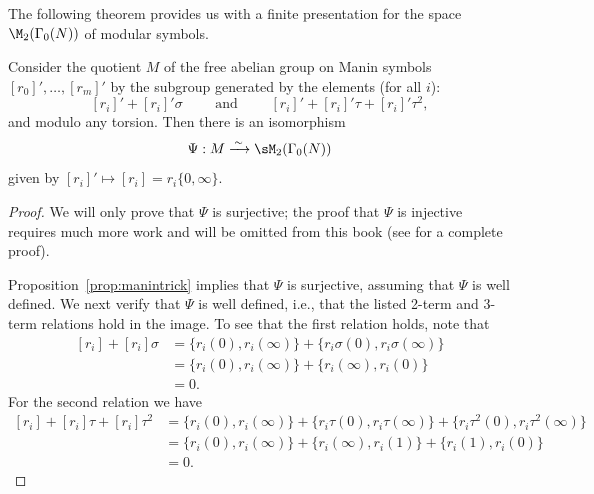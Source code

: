 The following theorem provides us with a finite presentation for the
space $\M_2(\Gamma_0(N))$ of modular symbols.
\begin{theorem}[Manin]\label{thm:manin_present}
Consider the quotient $M$ of the free abelian group
on Manin symbols $[r_0]',\ldots,[r_m]'$ by the subgroup
generated by the elements (for all $i$):
$$
{[r_i]'} + [r_i]'\sigma \qquad\text{ and }\qquad
{[r_i]'} + [r_i]'\tau + [r_i]'\tau^2 ,
$$
and modulo any torsion.
Then there is an isomorphism 
$$\Psi: M \xrightarrow{\,\sim\,} \sM_2(\Gamma_0(N))$$
given by $[r_i]' \mapsto [r_i] = r_i \{0,\infty\}$.
\end{theorem}
\begin{proof}
We will only prove that $\Psi$ is surjective;
the proof that $\Psi$ is injective requires much more work and
will be omitted from this book (see \cite[\S1.7]{manin:parabolic}
for a complete proof). 

Proposition~\ref{prop:manintrick} implies that 
$\Psi$ is surjective, assuming that $\Psi$ is
well defined. 
We next verify that $\Psi$ is well defined, i.e.,
that the listed 2-term and 3-term relations hold in
the image. 
To see that the first relation holds, note that
\begin{align*}
  {[r_i]} + [r_i]\sigma 
  &= \{r_i(0),r_i(\infty)\} +  \{r_i\sigma(0), r_i\sigma(\infty)\}\\
&= \{r_i(0),r_i(\infty)\} +  \{r_i(\infty), r_i(0)\} \\
 & = 0.
\end{align*}
For the second relation we have
\begin{align*}
{[r_i]} + [r_i]\tau + [r_i]\tau^2 &= 
    \{r_i(0),r_i(\infty)\} +  \{r_i\tau(0), r_i\tau(\infty)\}
                  + \{r_i\tau^2(0), r_i\tau^2(\infty)\} \\
  &= \{r_i(0),r_i(\infty)\} +  \{r_i(\infty), r_i(1)\}
                  + \{r_i(1), r_i(0)\} \\
  &= 0.
\end{align*}

\end{proof}

